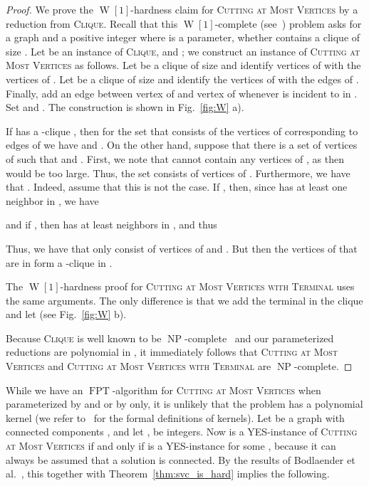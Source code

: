 \documentclass[a4paper,11pt]{article}
\theoremstyle{definition}
\theoremstyle{remark}
\DeclareMathOperator{\operatorClassNP}{NP}
\newcommand{\classNP}{\ensuremath{\operatorClassNP}}
\DeclareMathOperator{\operatorClassFPT}{FPT}
\newcommand{\classFPT}{\ensuremath{\operatorClassFPT}}
\DeclareMathOperator{\operatorClassW}{W}
\newcommand{\classW}[1]{\ensuremath{\operatorClassW[#1]}}
\begin{document}
\begin{proof}
We prove the \classW{1}-hardness claim for \textsc{Cutting at Most   Vertices} by a reduction from  \textsc{Clique}. 
Recall that this \classW{1}-complete (see~\cite{DowneyF99}) problem asks for a graph  and a positive integer  where  is a parameter, whether  contains a clique of size .
Let  be an instance of \textsc{Clique},  and ; we construct an instance  of \textsc{Cutting at Most   Vertices} as follows. Let  be a clique of size  and identify  vertices of  with the vertices of . Let  be a clique of size  and identify the vertices of  with the edges of . Finally, add an edge between vertex  of  and vertex  of  whenever  is incident to  in . Set  and . The construction is shown in Fig.~\ref{fig:W} a).

If  has a -clique , then for the set  that consists of the vertices  of  corresponding to edges of  we have  and . On the other hand, suppose that there is a set of vertices  of  such that  and .
 First, we note that  cannot contain any vertices of , as then  would be too large. Thus, the set  consists of vertices of . Furthermore, we have that . Indeed, assume that this is not the case. If , then, since  has at least one neighbor in , we have

and if , then  has at least  neighbors in , and thus

Thus, we have that  only consist of vertices of  and . But then the vertices of  that are in  form a -clique in .

The \classW{1}-hardness proof for \textsc{Cutting at Most   Vertices with Terminal} uses the same arguments. The only difference is that we add the terminal  in the clique  and let  (see Fig.~\ref{fig:W} b).

Because \textsc{Clique} is well known to be \classNP-complete~\cite{GareyJ79} and our parameterized reductions are polynomial in , it immediately follows that \textsc{Cutting at Most   Vertices} and \textsc{Cutting at Most   Vertices with Terminal} are \classNP-complete.
\end{proof}

While we have an \classFPT-algorithm for  \textsc{Cutting at Most   Vertices} when parameterized by  and  or by  only, it is unlikely that the problem has a polynomial kernel (we refer to~\cite{DowneyF99,FlumG06,Niedermeierbook06} for the formal definitions of kernels). Let  be a graph with  connected components , and let ,  be integers. Now  is a YES-instance of  \textsc{Cutting at Most   Vertices} if and only if  is a YES-instance for some , because 
it can always be assumed that a solution is connected.
By the results of Bodlaender et al.~\cite{BodlaenderDFH09}, this together with Theorem~\ref{thm:svc_is_hard} implies the following.
\end{document}
